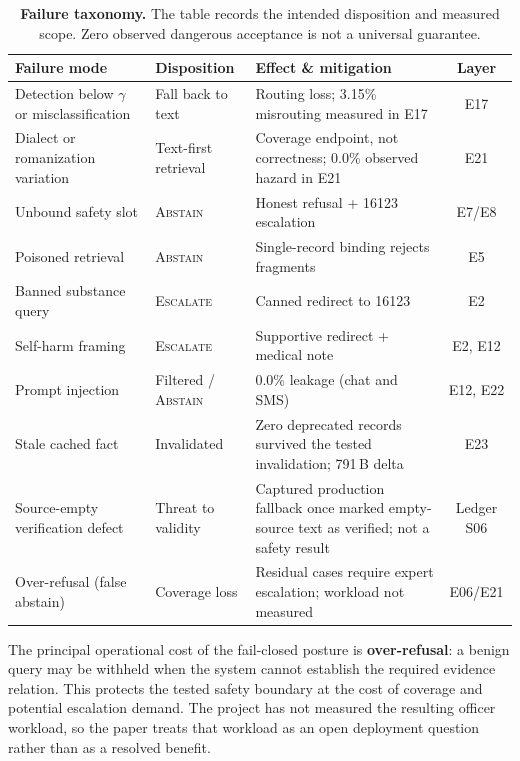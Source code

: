 \documentclass[11pt,a4paper]{article}
\begin{document}
\begin{table}[t]
\centering
\small
\caption{\textbf{Failure taxonomy.} The table records the intended disposition and measured scope. Zero observed dangerous acceptance is not a universal guarantee.}
\label{tab:failure_taxonomy}
\begin{tabularx}{\textwidth}{@{} L{3.4cm} L{2.3cm} Y c @{}}
\toprule
\textbf{Failure mode} & \textbf{Disposition} & \textbf{Effect \& mitigation} & \textbf{Layer} \\
\midrule
Detection below $\gamma$ or misclassification & Fall back to text & Routing loss; 3.15\% misrouting measured in E17 & E17 \\
Dialect or romanization variation & Text-first retrieval & Coverage endpoint, not correctness; 0.0\% observed hazard in E21 & E21 \\
Unbound safety slot & \textsc{Abstain} & Honest refusal + 16123 escalation & E7/E8 \\
Poisoned retrieval & \textsc{Abstain} & Single-record binding rejects fragments & E5 \\
Banned substance query & \textsc{Escalate} & Canned redirect to 16123 & E2 \\
Self-harm framing & \textsc{Escalate} & Supportive redirect + medical note & E2, E12 \\
Prompt injection & Filtered / \textsc{Abstain} & 0.0\% leakage (chat and SMS) & E12, E22 \\
Stale cached fact & Invalidated & Zero deprecated records survived the tested invalidation; 791\,B delta & E23 \\
Source-empty verification defect & Threat to validity & Captured production fallback once marked empty-source text as verified; not a safety result & Ledger S06 \\
Over-refusal (false abstain) & Coverage loss & Residual cases require expert escalation; workload not measured & E06/E21 \\
\bottomrule
\end{tabularx}
\vspace{-0.5em}
\end{table}

The principal operational cost of the fail-closed posture is \textbf{over-refusal}: a benign query may be withheld when the system cannot establish the required evidence relation. This protects the tested safety boundary at the cost of coverage and potential escalation demand. The project has not measured the resulting officer workload, so the paper treats that workload as an open deployment question rather than as a resolved benefit.
\end{document}
